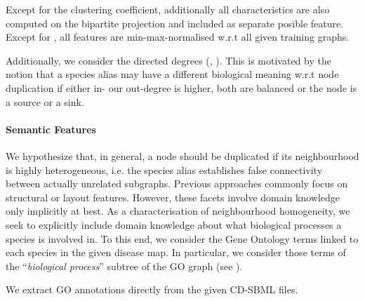 \documentclass[
	fontsize=10pt, %
	twoside=false, %
	secnumdepth=1, %
]{kaobook}
\begin{document}
Except for the clustering coefficient, additionally all characteristics are also
computed on the bipartite projection and included as separate posible feature.
Except for , all features are min-max-normalised
w.r.t all given training graphs.


Additionally, we consider the directed degrees (,
). This is motivated by the notion that a species alias may
have a different biological meaning w.r.t node duplication if either in- our
out-degree is higher, both are balanced or the node is a source or a sink.


\paragraph{Semantic Features}


We hypothesize that, in general, a node should be duplicated if its
neighbourhood is highly heterogeneous, i.e. the species alias establishes false
connectivity between actually unrelated subgraphs.
Previous approaches commonly focus on structural or layout features.
However, these facets involve domain knowledge only implicitly at best.
As a characterisation of neighbourhood homogeneity, we seek
to explicitly include domain knowledge about what biological processes a species
is involved in. To this end, we consider the Gene Ontology terms linked to each
species in the given disease map. In particular, we consider those terms of the
``\textit{biological process}'' subtree of the GO graph (see
).

We extract GO annotations directly from the given CD-SBML files.
\end{document}
